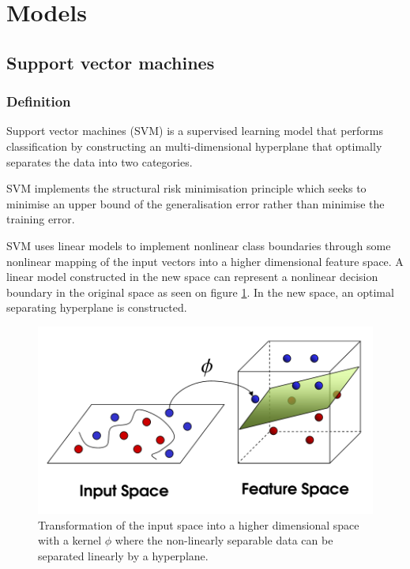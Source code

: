 \documentclass[11pt,a4paper,oneside]{book}
\begin{document}
\section{Models}\label{MLalgs}

\subsection{Support vector machines}

\subsubsection{Definition}

Support vector machines (SVM) is a supervised learning model that performs classification by constructing an multi-dimensional hyperplane that optimally separates the data into two categories. 

SVM implements the structural risk minimisation principle which seeks to minimise an upper bound of the generalisation error rather than minimise the training error.

SVM uses linear models to implement nonlinear class boundaries through some nonlinear mapping of the input vectors into a higher dimensional feature space. A linear model constructed in the new space can represent a nonlinear decision boundary in the original space as seen on figure \ref{fig:svm}. In the new space, an optimal separating hyperplane is constructed. \cite{kim}\cite{liwang}\cite{Smola}


\begin{figure}[!h]
  \centering
    \includegraphics[scale=0.45]{img/svm.png}
  \caption{Transformation of the input space into a higher dimensional space with a kernel $\phi$ where the non-linearly separable data can be separated linearly by a hyperplane.}
  \label{fig:svm}
\end{figure}
\end{document}
